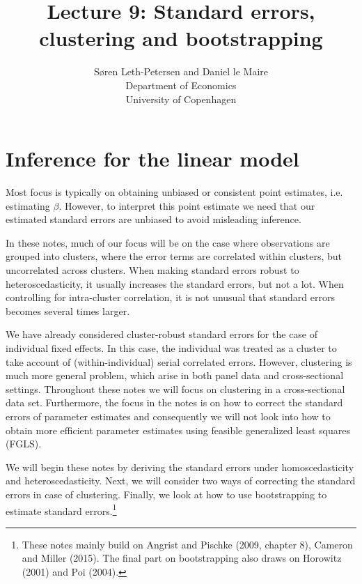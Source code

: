 \documentclass{article}
\begin{document}
\title{\bigskip Lecture 9: Standard errors, clustering and bootstrapping}
\author{S\o ren Leth-Petersen and Daniel le Maire \\
Department of Economics\\
University of Copenhagen}
\maketitle
\tableofcontents

\section{Inference for the linear model}

Most focus is typically on obtaining unbiased or consistent point estimates,
i.e. estimating $\beta $. However, to interpret this point estimate we need
that our estimated standard errors are unbiased to avoid misleading
inference.

In these notes, much of our focus will be on the case where observations are
grouped into clusters, where the error terms are correlated within clusters,
but uncorrelated across clusters. When making standard errors robust to
heteroscedasticity, it usually increases the standard errors, but not a lot.
When controlling for intra-cluster correlation, it is not unusual that
standard errors becomes several times larger.

We have already considered cluster-robust standard errors for the case of
individual fixed effects. In this case, the individual was treated as a
cluster to take account of (within-individual) serial correlated errors.
However, clustering is much more general problem, which arise in both panel
data and cross-sectional settings. Throughout these notes we will focus on
clustering in a cross-sectional data set. Furthermore, the focus in the
notes is on how to correct the standard errors of parameter estimates and
consequently we will not look into how to obtain more efficient parameter
estimates using feasible generalized least squares (FGLS).

We will begin these notes by deriving the standard errors under
homoscedasticity and heteroscedasticity. Next, we will consider two ways of
correcting the standard errors in case of clustering. Finally, we look at
how to use bootstrapping to estimate standard errors.\footnote{%
These notes mainly build on Angrist and Pischke (2009, chapter 8), Cameron
and Miller (2015). The final part on bootstrapping also draws on Horowitz
(2001) and Poi (2004).}
\end{document}

